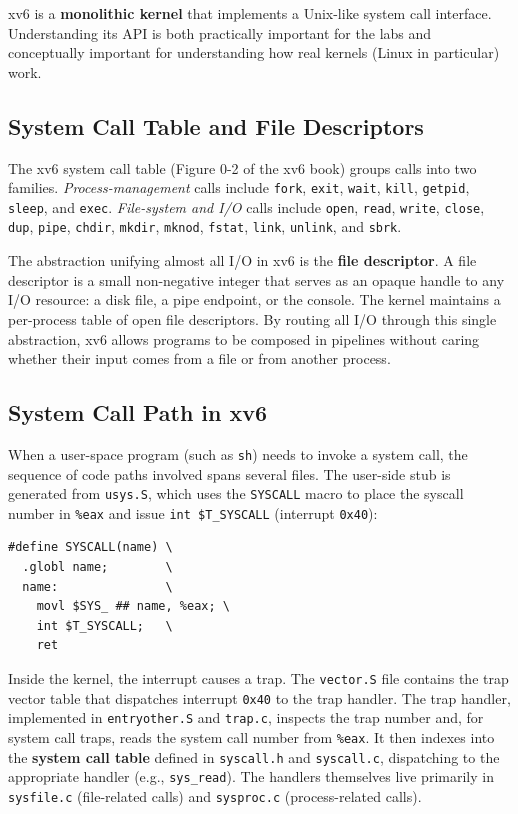 \documentclass[11pt]{article}
\begin{document}
xv6 is a \textbf{monolithic kernel} that implements a Unix-like system call interface. Understanding its API is both practically important for the labs and conceptually important for understanding how real kernels (Linux in particular) work.

\subsection{System Call Table and File Descriptors}

The xv6 system call table (Figure 0-2 of the xv6 book) groups calls into two families. \emph{Process-management} calls include \texttt{fork}, \texttt{exit}, \texttt{wait}, \texttt{kill}, \texttt{getpid}, \texttt{sleep}, and \texttt{exec}. \emph{File-system and I/O} calls include \texttt{open}, \texttt{read}, \texttt{write}, \texttt{close}, \texttt{dup}, \texttt{pipe}, \texttt{chdir}, \texttt{mkdir}, \texttt{mknod}, \texttt{fstat}, \texttt{link}, \texttt{unlink}, and \texttt{sbrk}.

The abstraction unifying almost all I/O in xv6 is the \textbf{file descriptor}. A file descriptor is a small non-negative integer that serves as an opaque handle to any I/O resource: a disk file, a pipe endpoint, or the console. The kernel maintains a per-process table of open file descriptors. By routing all I/O through this single abstraction, xv6 allows programs to be composed in pipelines without caring whether their input comes from a file or from another process.

\subsection{System Call Path in xv6}

When a user-space program (such as \texttt{sh}) needs to invoke a system call, the sequence of code paths involved spans several files. The user-side stub is generated from \texttt{usys.S}, which uses the \texttt{SYSCALL} macro to place the syscall number in \texttt{\%eax} and issue \texttt{int \$T\_SYSCALL} (interrupt \texttt{0x40}):

\begin{lstlisting}[language={[x86masm]Assembler}, caption={User-side syscall stub generated by usys.S (simplified)}]
#define SYSCALL(name) \
  .globl name;        \
  name:               \
    movl $SYS_ ## name, %eax; \
    int $T_SYSCALL;   \
    ret
\end{lstlisting}

Inside the kernel, the interrupt causes a trap. The \texttt{vector.S} file contains the trap vector table that dispatches interrupt \texttt{0x40} to the trap handler. The trap handler, implemented in \texttt{entryother.S} and \texttt{trap.c}, inspects the trap number and, for system call traps, reads the system call number from \texttt{\%eax}. It then indexes into the \textbf{system call table} defined in \texttt{syscall.h} and \texttt{syscall.c}, dispatching to the appropriate handler (e.g., \texttt{sys\_read}). The handlers themselves live primarily in \texttt{sysfile.c} (file-related calls) and \texttt{sysproc.c} (process-related calls).
\end{document}
